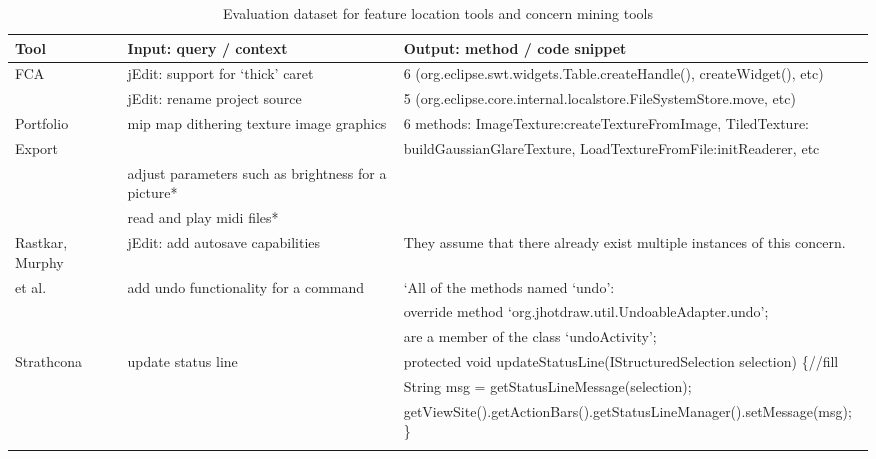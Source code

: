 

\begin{table*}[ht]
\begin{center}
\caption{Evaluation dataset for feature location tools and concern mining tools}
\label{tab:total}
\scriptsize{
\begin{tabular*}{1\textwidth}{@{}l|l|l@{}} \hline
Tool&Input: query / context&Output: method / code snippet\\\hline
FCA~\cite{Denys:FCA12}&jEdit: support for `thick' caret &6 (org.eclipse.swt.widgets.Table.createHandle(), createWidget(), etc)\\
&jEdit: rename project source&5 (org.eclipse.core.internal.localstore.FileSystemStore.move, etc)\\ \hline
Portfolio~\cite{Portfolio:DenysICSE11}&mip map dithering texture image graphics&6 methods: ImageTexture:createTextureFromImage, TiledTexture:\\ 
Export~\cite{Export:DenysASE13}&&buildGaussianGlareTexture, LoadTextureFromFile:initReaderer, etc  \\
&adjust parameters such as brightness for a picture*\\
&read and play midi files*\\ \hline
Rastkar, Murphy&jEdit: add autosave capabilities&They assume that there already exist multiple instances of this concern.\\
 et al.~\cite{Murphy:nlConcern11}&add undo functionality for a command&`All of the methods named `undo': \\ 
 &&override method `org.jhotdraw.util.UndoableAdapter.undo';\\
 &&are a member of the class `undoActivity';\\ \hline
 Strathcona~\cite{Holmes:structural05}&update status line&protected void updateStatusLine(IStructuredSelection selection) \{//fill \\
&&String msg = getStatusLineMessage(selection);\\
&&getViewSite().getActionBars().getStatusLineManager().setMessage(msg); \}\\ 
&&\\

\end{tabular*}}
\end{center}
\end{table*}
